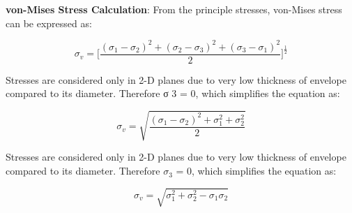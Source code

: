 \textbf{von-Mises Stress Calculation}: From the principle stresses, von-Mises stress can be expressed as:

\begin{equation}
\sigma _{v} = \Bigg[ \frac{(\sigma _{1}  - \sigma _{2})^2 + (\sigma _{2}  - \sigma _{3})^2 + (\sigma _{3}  - \sigma _{1})^2 }{2}   \Bigg]^{\frac{1}{2}}
\end{equation}

Stresses are considered only in 2-D planes due to very low thickness of envelope compared to its diameter. Therefore σ 3 = 0, which simplifies the equation as:

\begin{equation}
\sigma _{v} = \sqrt{\frac{(\sigma _{1} - \sigma _{2})^{2} + \sigma _{1} ^{2} + \sigma _{2} ^{2}}{2}}
\end{equation}

Stresses are considered only in 2-D planes due to very low thickness of envelope compared to its diameter. Therefore $ \sigma _{3} $ = 0, which simplifies the equation as:

\begin{equation}
\sigma _{v} = \sqrt{\sigma _{1} ^{2} + \sigma _{2} ^{2} - \sigma _{1} \sigma _{2}}
\end{equation}

